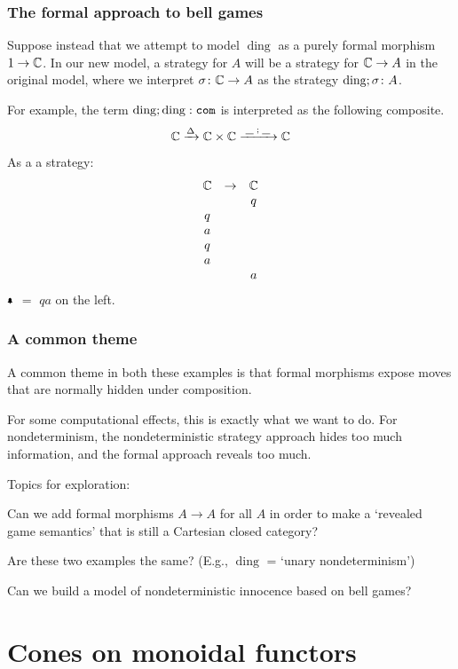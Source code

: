 \documentclass{beamer}
\DeclareMathOperator{\ding}{ding}
\begin{document}
\begin{frame}
  \frametitle{The formal approach to bell games}
  Suppose instead that we attempt to model $\ding$ as a purely formal morphism $1\to\mathbb{C}$.  
  In our new model, a strategy for $A$ will be a strategy for $\mathbb{C}\to A$ in the original model, where we interpret $\sigma\colon\mathbb{C}\to A$ as the strategy $\ding;\sigma\from A$.
  \pause

  For example, the term $\ding;\ding:\com$ is interpreted as the following composite.
  \[
    \mathbb{C} \xrightarrow{\Delta}
    \mathbb{C} \times \mathbb{C} \xrightarrow{\;\underline{\hspace{1.5ex}}\;;\;\underline{\hspace{1.5ex}}\;}
    \mathbb{C}
    \]
  \pause
  \renewcommand*{\arraystretch}{.75}
  As a a strategy:
  \[
    \begin{array}{ccc}
      \mathbb{C} & \to & \mathbb{C} \\
          &     &  q  \\
       q  &     &     \\
       a  &     &     \\
       q  &     &     \\
       a  &     &     \\
          &     &  a  \\
    \end{array}
    \]
\pause
$\bell$ $=$ $qa$ on the left.
\end{frame}

\begin{frame}
  \frametitle{A common theme}

  A common theme in both these examples is that formal morphisms expose moves that are normally hidden under composition.
  \pause

  For some computational effects, this is exactly what we want to do. For nondeterminism, the nondeterministic strategy approach hides too much information, and the formal approach reveals too much.
  \pause

  Topics for exploration:
  \pause

  Can we add formal morphisms $A\to A$ for all $A$ in order to make a `revealed game semantics' that is still a Cartesian closed category?
  \pause

  Are these two examples the same?  (E.g., $\ding$ = `unary nondeterminism')
  \pause

  Can we build a model of nondeterministic innocence based on bell games?
\end{frame}

\section{Cones on monoidal functors}
\end{document}
